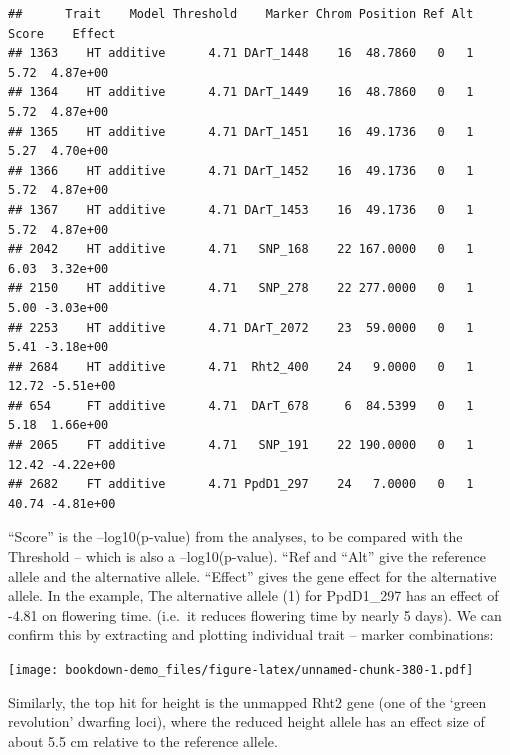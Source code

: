 \documentclass[
]{book}
\newenvironment{Shaded}{\begin{snugshade}}{\end{snugshade}}
\newcommand{\AttributeTok}[1]{\textcolor[rgb]{0.77,0.63,0.00}{#1}}
\newcommand{\FunctionTok}[1]{\textcolor[rgb]{0.00,0.00,0.00}{#1}}
\newcommand{\NormalTok}[1]{#1}
\newcommand{\SpecialCharTok}[1]{\textcolor[rgb]{0.00,0.00,0.00}{#1}}
\begin{document}
\begin{verbatim}
##      Trait    Model Threshold    Marker Chrom Position Ref Alt Score    Effect
## 1363    HT additive      4.71 DArT_1448    16  48.7860   0   1  5.72  4.87e+00
## 1364    HT additive      4.71 DArT_1449    16  48.7860   0   1  5.72  4.87e+00
## 1365    HT additive      4.71 DArT_1451    16  49.1736   0   1  5.27  4.70e+00
## 1366    HT additive      4.71 DArT_1452    16  49.1736   0   1  5.72  4.87e+00
## 1367    HT additive      4.71 DArT_1453    16  49.1736   0   1  5.72  4.87e+00
## 2042    HT additive      4.71   SNP_168    22 167.0000   0   1  6.03  3.32e+00
## 2150    HT additive      4.71   SNP_278    22 277.0000   0   1  5.00 -3.03e+00
## 2253    HT additive      4.71 DArT_2072    23  59.0000   0   1  5.41 -3.18e+00
## 2684    HT additive      4.71  Rht2_400    24   9.0000   0   1 12.72 -5.51e+00
## 654     FT additive      4.71  DArT_678     6  84.5399   0   1  5.18  1.66e+00
## 2065    FT additive      4.71   SNP_191    22 190.0000   0   1 12.42 -4.22e+00
## 2682    FT additive      4.71 PpdD1_297    24   7.0000   0   1 40.74 -4.81e+00
\end{verbatim}

``Score'' is the --log10(p-value) from the analyses, to be compared with the Threshold -- which is also a --log10(p-value). ``Ref and ``Alt'' give the reference allele and the alternative allele. ``Effect'' gives the gene effect for the alternative allele. In the example, The alternative allele (1) for PpdD1\_297 has an effect of -4.81 on flowering time. (i.e.~it reduces flowering time by nearly 5 days). We can confirm this by extracting and plotting individual trait -- marker combinations:

\begin{Shaded}
\end{Shaded}

\texttt{[image: bookdown-demo\_files/figure-latex/unnamed-chunk-380-1.pdf]}

Similarly, the top hit for height is the unmapped Rht2 gene (one of the `green revolution' dwarfing loci), where the reduced height allele has an effect size of about 5.5 cm relative to the reference allele.
\end{document}

